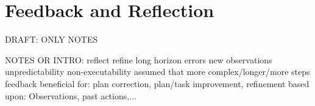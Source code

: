 \documentclass{article}
\begin{document}

%
%
%
%
%
%
%
%

\FloatBarrier
\section{Feedback and Reflection}
DRAFT: ONLY NOTES

NOTES OR INTRO:
reflect 
refine 
long horizon 
errors 
new observations 
unpredictability 
non-executability 
assumed that more complex/longer/more steps feedback beneficial 
for: plan correction, plan/task improvement, refinement 
based upon: Observations, past actions,...
\end{document}
